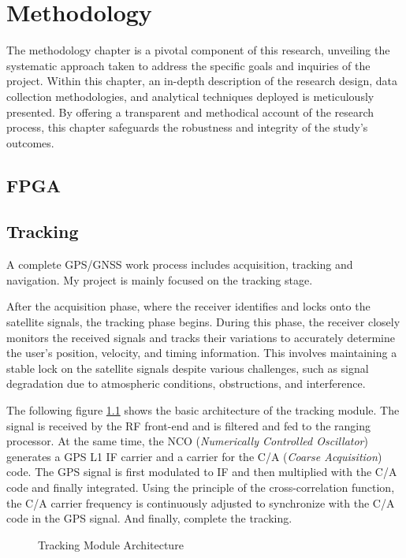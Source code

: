 \myClearDoublePage
\chapter{Methodology}
The methodology chapter is a pivotal component of this research, unveiling the systematic approach taken to address the specific goals and inquiries of the project. Within this chapter, an in-depth description of the research design, data collection methodologies, and analytical techniques deployed is meticulously presented. By offering a transparent and methodical account of the research process, this chapter safeguards the robustness and integrity of the study's outcomes.

\section{FPGA}



\section{Tracking}
A complete GPS/GNSS work process includes acquisition, tracking and navigation. My project is mainly focused on the tracking stage.

After the acquisition phase, where the receiver identifies and locks onto the satellite signals, the tracking phase begins. During this phase, the receiver closely monitors the received signals and tracks their variations to accurately determine the user's position, velocity, and timing information. This involves maintaining a stable lock on the satellite signals despite various challenges, such as signal degradation due to atmospheric conditions, obstructions, and interference.

The following figure \ref{fig:tracking_digram} shows the basic architecture of the tracking module. The signal is received by the RF front-end and is filtered and fed to the ranging processor. At the same time, the NCO (\textit{Numerically Controlled Oscillator}) generates a GPS L1 IF carrier and a carrier for the C/A (\textit{Coarse Acquisition}) code. The GPS signal is first modulated to IF and then multiplied with the C/A code and finally integrated. Using the principle of the cross-correlation function, the C/A carrier frequency is continuously adjusted to synchronize with the C/A code in the GPS signal. And finally, complete the tracking\cite{RN151}.
\begin{figure}[!h]
    \centering
    
    \caption{Tracking Module Architecture}
    \label{fig:tracking_digram}
\end{figure}

